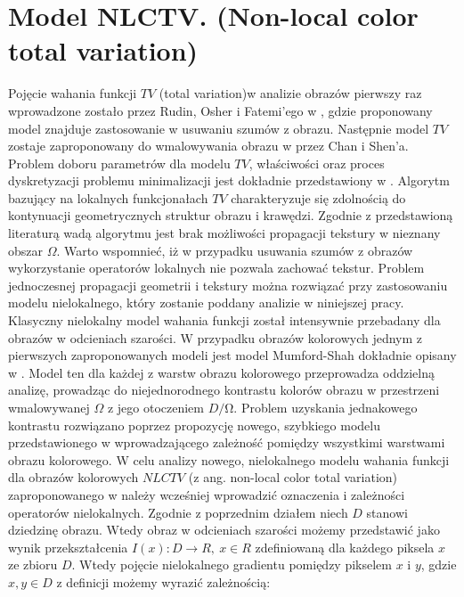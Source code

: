 \documentclass[12pt, twoside, openany]{report}
\theoremstyle{definition}
\begin{document}
\section{Model NLCTV. (Non-local color total variation)}
Pojęcie wahania funkcji $TV$ (total variation)w analizie obrazów pierwszy raz wprowadzone zostało przez Rudin, Osher i Fatemi’ego w \cite{rudin1992nonlinear}, gdzie proponowany model znajduje zastosowanie w usuwaniu szumów z obrazu. Następnie model $TV$ zostaje zaproponowany do wmalowywania obrazu w \cite{MathematicalModelsforNLTextureInpainting} przez Chan i Shen’a. Problem doboru parametrów dla modelu $TV$, właściwości oraz proces dyskretyzacji problemu minimalizacji jest dokładnie przedstawiony w \cite{getreuer2012total}. Algorytm bazujący na lokalnych funkcjonałach $TV$  charakteryzuje się zdolnością do kontynuacji geometrycznych struktur obrazu i krawędzi. Zgodnie z przedstawioną literaturą wadą algorytmu jest brak możliwości propagacji tekstury w nieznany obszar $\Omega$. Warto wspomnieć, iż w przypadku usuwania szumów z obrazów wykorzystanie operatorów lokalnych nie pozwala zachować tekstur. Problem jednoczesnej propagacji geometrii i tekstury można rozwiązać przy zastosowaniu modelu nielokalnego, który zostanie poddany analizie w niniejszej pracy. \\
Klasyczny nielokalny model wahania funkcji został intensywnie przebadany dla obrazów w odcieniach szarości. W przypadku obrazów kolorowych jednym z pierwszych zaproponowanych modeli jest model Mumford-Shah dokładnie opisany w \cite{jung2011nonlocal}. Model ten dla każdej z warstw obrazu kolorowego przeprowadza oddzielną analizę, prowadząc do niejednorodnego kontrastu kolorów obrazu w przestrzeni wmalowywanej $\Omega$ z jego otoczeniem $D/\mathrm{\Omega}$. Problem uzyskania jednakowego kontrastu rozwiązano poprzez propozycję nowego, szybkiego modelu przedstawionego w \cite{duan2015fast} wprowadzającego zależność pomiędzy wszystkimi warstwami obrazu kolorowego. W celu analizy nowego, nielokalnego modelu wahania funkcji dla obrazów kolorowych $NLCTV$ (z ang. non-local color total variation) zaproponowanego w \cite{duan2015fast} należy wcześniej wprowadzić oznaczenia i zależności operatorów nielokalnych. 
Zgodnie z poprzednim działem niech $D$ stanowi dziedzinę obrazu. Wtedy obraz w odcieniach szarości możemy przedstawić jako wynik przekształcenia $I\left(x\right):D\longrightarrow R,\ x\in R$ zdefiniowaną dla każdego piksela $x$ ze zbioru $D$. Wtedy pojęcie nielokalnego gradientu pomiędzy pikselem $x$ i $y$, gdzie $x,y\in D$ z definicji możemy wyrazić zależnością:
\end{document}
